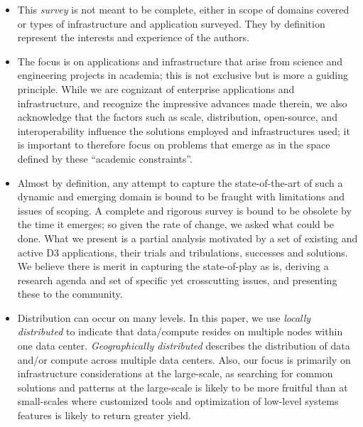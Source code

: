 \begin{itemize}

\item This {\it survey} is not meant to be complete, either in scope of domains
  covered or types of infrastructure and application surveyed.  They by
  definition represent the interests and experience of the authors.

\item The focus is on applications and infrastructure that arise from science
  and engineering projects in academia; this is not exclusive but is more a
  guiding principle.  While we are cognizant of enterprise applications and
  infrastructure, and recognize the impressive advances made therein, we also
  acknowledge that the factors such as scale, distribution, open-source, and
  interoperability influence the solutions employed and infrastructures used; it
  is important to therefore focus on problems that emerge as in the space
  defined by these ``academic constraints''.

\item Almost by definition, any attempt to capture the state-of-the-art of such
  a dynamic and emerging domain is bound to be fraught with limitations and
  issues of scoping.  A complete and rigorous survey is bound to be obsolete by
  the time it emerges; so given the rate of change, we asked what could be
  done. What we present is a partial analysis motivated by a set of existing and
  active D3 applications, their trials and tribulations, successes and
  solutions. We believe there is merit in capturing the state-of-play as is,
  deriving a research agenda and set of specific yet crosscutting issues, and
  presenting these to the community.

\item Distribution can occur on many levels.  In this paper, we use {\em locally
    distributed} to indicate that data/compute resides on multiple nodes within
  one data center.  {\em Geographically distributed} describes the distribution
  of data and/or compute across multiple data centers.  Also, our focus is
  primarily on infrastructure considerations at the large-scale, as searching
  for common solutions and patterns at the large-scale is likely to be more
  fruitful than at small-scales where customized tools and optimization of
  low-level systems features is likely to return greater yield.


\end{itemize}



